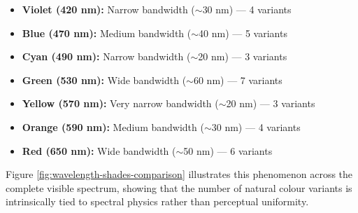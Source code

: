 \documentclass[12pt,a4paper]{article}
\begin{document}
\begin{itemize}
\item \textbf{Violet (420 nm):} Narrow bandwidth ($\sim$30 nm) — 4 variants
\item \textbf{Blue (470 nm):} Medium bandwidth ($\sim$40 nm) — 5 variants
\item \textbf{Cyan (490 nm):} Narrow bandwidth ($\sim$20 nm) — 3 variants
\item \textbf{Green (530 nm):} Wide bandwidth ($\sim$60 nm) — 7 variants
\item \textbf{Yellow (570 nm):} Very narrow bandwidth ($\sim$20 nm) — 3 variants
\item \textbf{Orange (590 nm):} Medium bandwidth ($\sim$30 nm) — 4 variants
\item \textbf{Red (650 nm):} Wide bandwidth ($\sim$50 nm) — 6 variants
\end{itemize}

Figure \ref{fig:wavelength-shades-comparison} illustrates this phenomenon across the complete visible spectrum, showing that the number of natural colour variants is intrinsically tied to spectral physics rather than perceptual uniformity.
\end{document}
